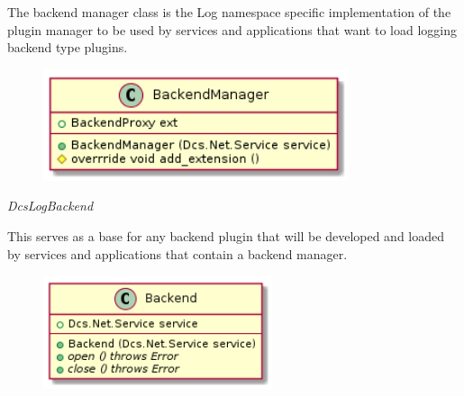       \vspace*{-0.75cm}
      \begin{minipage}[t]{0.5\textwidth}
        \vspace*{0.5cm}
        The backend manager class is the Log namespace specific implementation
        of the plugin manager to be used by services and applications that want
        to load logging backend type plugins.
      \end{minipage} \hfill
      \begin{minipage}[t]{0.45\textwidth}
        \begin{figure}[H]
          \includegraphics[width=0.8\textwidth]{figures/design/class/log/backend-manager}
          \label{fig:dsg-classes-log-backend-manager}
        \end{figure}
      \end{minipage}

      \emph{DcsLogBackend}

      \vspace*{-0.75cm}
      \begin{minipage}[t]{0.5\textwidth}
        \vspace*{0.5cm}
        This serves as a base for any backend plugin that will be developed and
        loaded by services and applications that contain a backend manager.
      \end{minipage} \hfill
      \begin{minipage}[t]{0.45\textwidth}
        \begin{figure}[H]
          \includegraphics[width=0.6\textwidth]{figures/design/class/log/backend}
          \label{fig:dsg-classes-log-backend}
        \end{figure}
      \end{minipage}

